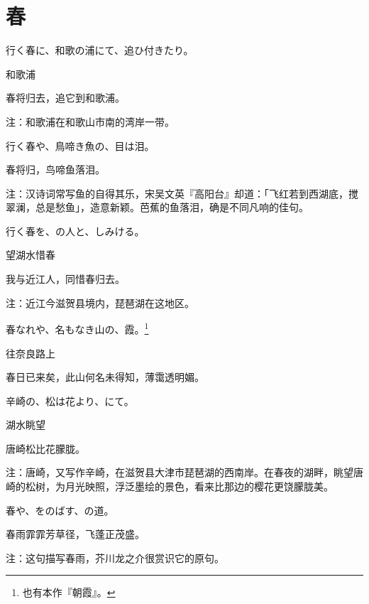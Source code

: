 \section{\FK 春}

\setcounter{haikucounter}{0}

\begin{haiku}
    {\FH 行く春に、和歌の浦にて、追ひ付きたり。}

    {\FK 和歌浦}

    {\FK 春将归去，追它到和歌浦。}

    {\FT 注：和歌浦在和歌山市南的湾岸一带。}
\end{haiku}

\begin{haiku}
    {\FH 行く春や、鳥啼き魚の、目は泪。}

    {\FK 春将归，鸟啼鱼落泪。}

    {\FT 注：汉诗词常写鱼的自得其乐，宋吴文英『高阳台』却道：「飞红若到西湖底，搅翠澜，总是愁鱼」，造意新颖。芭蕉的鱼落泪，确是不同凡响的佳句。}
\end{haiku}

\begin{haiku}
    {\FH 行く春を、の人と、しみける。}

    {\FK 望湖水惜春}

    {\FK 我与近江人，同惜春归去。}

    {\FT 注：近江今滋贺县境内，琵琶湖在这地区。}
\end{haiku}

\begin{haiku}
    {\FH 春なれや、名もなき山の、霞。\footnote{\FT 也有本作『朝霞』。}}

    {\FK 往奈良路上}

    {\FK 春日已来矣，此山何名未得知，薄霭透明媚。}
\end{haiku}

\begin{haiku}
    {\FH 辛崎の、松は花より、にて。}

    {\FK 湖水眺望}

    {\FK 唐崎松比花朦胧。}

    {\FT 注：唐崎，又写作辛崎，在滋贺县大津市琵琶湖的西南岸。在春夜的湖畔，眺望唐崎的松树，为月光映照，浮泛墨绘的景色，看来比那边的樱花更饶朦胧美。}
\end{haiku}

\begin{haiku}
    {\FH 春や、をのばす、の道。}

    {\FK 春雨霏霏芳草径，飞蓬正茂盛。}

    {\FT 注：这句描写春雨，芥川龙之介很赏识它的原句。}
\end{haiku}

